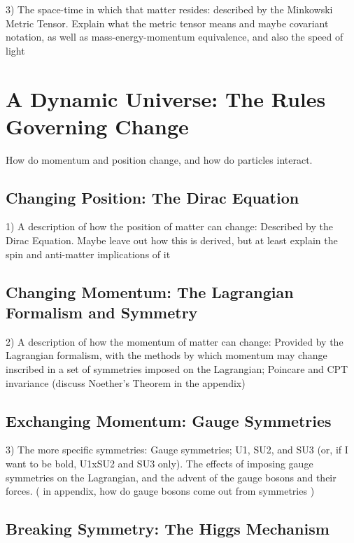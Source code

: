     3) The space-time in which that matter resides: described by the Minkowski Metric Tensor.
        Explain what the metric tensor means and maybe covariant notation,
        as well as mass-energy-momentum equivalence,
        and also the speed of light



\section{A Dynamic Universe: The Rules Governing Change}

    How do momentum and position change, and how do particles interact.

    \subsection{Changing Position: The Dirac Equation}

    1) A description of how the position of matter can change: Described by the Dirac Equation.
        Maybe leave out how this is derived, but at least explain the spin and anti-matter implications of it

    \subsection{Changing Momentum: The Lagrangian Formalism and Symmetry}

    2) A description of how the momentum of matter can change: Provided by the Lagrangian formalism,
        with the methods by which momentum may change inscribed in a set of symmetries imposed on the Lagrangian;
        Poincare and CPT invariance (discuss Noether's Theorem in the appendix)

    \subsection{Exchanging Momentum: Gauge Symmetries}

    3) The more specific symmetries:
        Gauge symmetries; U1, SU2, and SU3 (or, if I want to be bold, U1xSU2 and SU3 only).
        The effects of imposing gauge symmetries on the Lagrangian, and the advent of the gauge bosons and their forces.
        ( in appendix, how do gauge bosons come out from symmetries )

    \subsection{Breaking Symmetry: The Higgs Mechanism}

